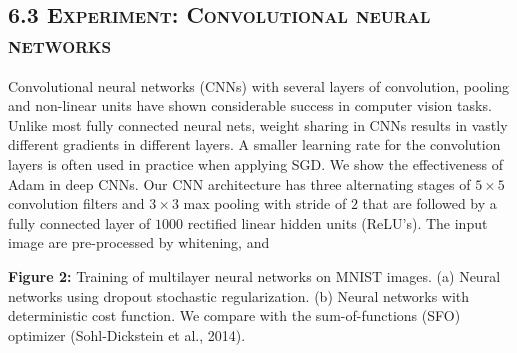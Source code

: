 \documentclass[11pt]{article}
\begin{document}
\vspace{0.5em}

\subsection*{6.3 \textsc{Experiment: Convolutional neural networks}}

Convolutional neural networks (CNNs) with several layers of
convolution, pooling and non-linear units have shown considerable
success in computer vision tasks. Unlike most fully connected
neural nets, weight sharing in CNNs results in vastly different
gradients in different layers. A smaller learning rate for the
convolution layers is often used in practice when applying SGD.
We show the effectiveness of Adam in deep CNNs. Our CNN
architecture has three alternating stages of $5 \times 5$
convolution filters and $3 \times 3$ max pooling with stride of
$2$ that are followed by a fully connected layer of $1000$
rectified linear hidden units (ReLU's). The input image are
pre-processed by whitening, and


\newpage

\setcounter{equation}{5}

\noindent
\begin{center}
\end{center}
\vspace{0.3em}
\begin{center}
\textbf{Figure 2:} Training of multilayer neural networks on
MNIST images. (a) Neural networks using dropout stochastic
regularization. (b) Neural networks with deterministic cost
function. We compare with the sum-of-functions (SFO) optimizer
(Sohl-Dickstein et al., 2014).
\end{center}
\end{document}
